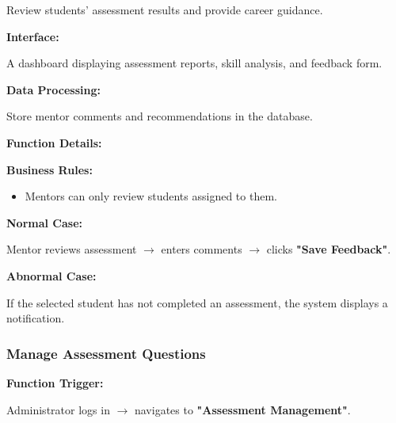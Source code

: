 Review students' assessment results and provide career guidance.

\vspace{0.2cm}

\textbf{Interface:}

A dashboard displaying assessment reports, skill analysis, and feedback form.

\vspace{0.2cm}

\textbf{Data Processing:}

Store mentor comments and recommendations in the database.

\vspace{0.3cm}

\textbf{Function Details:}

\textbf{Business Rules:}

\begin{itemize}
\item Mentors can only review students assigned to them.
\end{itemize}

\textbf{Normal Case:}

Mentor reviews assessment $\rightarrow$ enters comments $\rightarrow$ clicks \textbf{"Save Feedback"}.

\textbf{Abnormal Case:}

If the selected student has not completed an assessment, the system displays a notification.

%

\subsubsection{Manage Assessment Questions}

\textbf{Function Trigger:}

Administrator logs in $\rightarrow$ navigates to \textbf{"Assessment Management"}.

\vspace{0.3cm}

